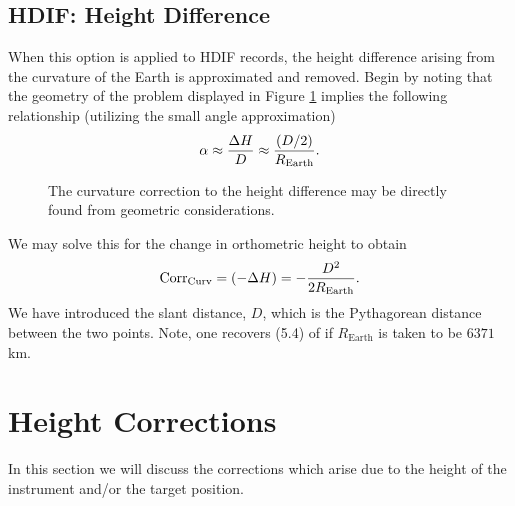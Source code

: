 \subsection{HDIF: Height Difference}
When this option is applied to HDIF records, the height difference arising from the curvature of the Earth is approximated and removed.  Begin by noting that the geometry of the problem displayed in Figure \ref{Fig:Curv} implies the following relationship (utilizing the small angle approximation)
\begin{equation}
\alpha \approx \frac{\Delta H}{D} \approx \frac{(D/2)}{R_{\text{Earth}}}.
\end{equation}

\begin{figure}[!htbp]
\centering
{}
\caption{The curvature correction to the height difference may be directly found from geometric considerations.}
\label{Fig:Curv}
\end{figure}
We may solve this for the change in orthometric height to obtain
\begin{equation}
\text{Corr}_{\text{Curv}} = (-\Delta H) = -\frac{D^2}{2R_{\text{Earth}}}.
\end{equation}
We have introduced the slant distance, $D$, which is the Pythagorean distance between the two points.  Note, one recovers (5.4) of \cite{anderson} if $R_{\text{Earth}}$ is taken to be $6371$ km.

\section{Height Corrections}
In this section we will discuss the corrections which arise due to the height of the instrument and/or the target position.
